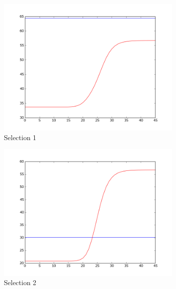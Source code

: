 \documentclass{article}
\begin{document}
\begin{figure}[!ht]
    \centering
    \begin{subfigure}[b]{0.5\textwidth}
        \includegraphics[width=\textwidth]{Part2/II221.png}
        \caption{Selection 1}
    \end{subfigure}
    \begin{subfigure}[b]{0.5\textwidth}
        \includegraphics[width=\textwidth]{Part2/II222.png}
        \caption{Selection 2}
    \end{subfigure}
    \begin{subfigure}[b]{0.5\textwidth}

\end{subfigure}
\end{figure}
\end{document}
